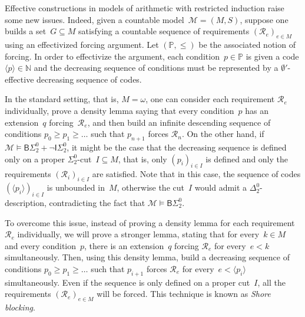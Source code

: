 \documentclass{article}
\def\PP{\mathbb{P}}
\newcommand{\Psf}{\mathsf{P}}
\def\R{\mathcal{R}}
\def\M{\mathcal{M}}
\newcommand{\ISig}{\mathsf{I}\Sigma^0}
\newcommand{\BSig}{\mathsf{B}\Sigma^0}
\newcommand{\NN}[0]{\mathbb{N}}
\numberwithin{theorem}{section}
\begin{document}
Effective constructions in models of arithmetic with restricted induction raise some new issues.
Indeed, given a countable model~$\M = (M, S)$, suppose one builds a set~$G \subseteq M$ satisfying a countable sequence of requirements $(\R_e)_{e \in M}$ using an effectivized forcing argument. Let $(\PP, \leq)$ be the associated notion of forcing. In order to effectivize the argument, each condition~$p \in \PP$ is given a code $\langle p \rangle \in \NN$ and the decreasing sequence of conditions must be represented by a $\emptyset'$-effective decreasing sequence of codes.

In the standard setting, that is, $M = \omega$, one can consider each requirement $\R_e$ individually, prove a density lemma saying that every condition~$p$ has an extension~$q$ forcing~$\R_e$, and then build an infinite descending sequence of conditions $p_0 \geq p_1 \geq \dots$ such that $p_{n+1}$ forces $\R_n$. On the other hand, if $\M \models \BSig_2 + \neg \ISig_2$, it might be the case that the decreasing sequence is defined only on a proper $\Sigma^0_2$-cut~$I \subseteq M$, that is, only $(p_i)_{i \in I}$ is defined and only the requirements $(\R_i)_{i \in I}$ are satisfied. Note that in this case, the sequence of codes $(\langle p_i\rangle)_{i \in I}$ is unbounded in~$M$, otherwise the cut~$I$ would admit a $\Delta^0_2$-description, contradicting the fact that $\M \models \BSig_2$.

To overcome this issue, instead of proving a density lemma for each requirement $\R_e$ individually, we will prove a stronger lemma, stating that for every~$k \in M$ and every condition~$p$, there is an extension~$q$ forcing $\R_e$ for every~$e < k$ simultaneously. Then, using this density lemma, build a decreasing sequence of conditions $p_0 \geq p_1 \geq \dots$ such that $p_{i+1}$ forces $\R_e$ for every~$e < \langle p_i\rangle$ simultaneously. Even if the sequence is only defined on a proper cut~$I$, all the requirements $(\R_e)_{e \in M}$ will be forced. This technique is known as \emph{Shore blocking}.


\end{document}
